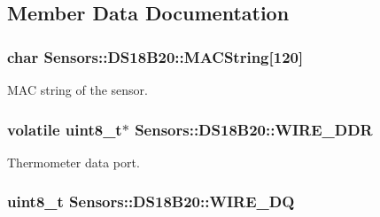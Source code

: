 \subsection{Member Data Documentation}
\subsubsection[{\texorpdfstring{M\+A\+C\+String}{MACString}}]{\setlength{\rightskip}{0pt plus 5cm}char Sensors\+::\+D\+S18\+B20\+::\+M\+A\+C\+String\mbox{[}120\mbox{]}\hspace{0.3cm}{\ttfamily [private]}}\hypertarget{classSensors_1_1DS18B20_a7c33b18028020215b85039dd9555a6df}{}\label{classSensors_1_1DS18B20_a7c33b18028020215b85039dd9555a6df}


M\+AC string of the sensor. 

\subsubsection[{\texorpdfstring{W\+I\+R\+E\+\_\+\+D\+DR}{WIRE_DDR}}]{\setlength{\rightskip}{0pt plus 5cm}volatile uint8\+\_\+t$\ast$ Sensors\+::\+D\+S18\+B20\+::\+W\+I\+R\+E\+\_\+\+D\+DR\hspace{0.3cm}{\ttfamily [private]}}\hypertarget{classSensors_1_1DS18B20_aceb52cdfb7462c8c7be8178181ae4dc5}{}\label{classSensors_1_1DS18B20_aceb52cdfb7462c8c7be8178181ae4dc5}


Thermometer data port. 

\subsubsection[{\texorpdfstring{W\+I\+R\+E\+\_\+\+DQ}{WIRE_DQ}}]{\setlength{\rightskip}{0pt plus 5cm}uint8\+\_\+t Sensors\+::\+D\+S18\+B20\+::\+W\+I\+R\+E\+\_\+\+DQ\hspace{0.3cm}{\ttfamily [private]}}\hypertarget{classSensors_1_1DS18B20_a10fe94bdfb9a37a86d34925534a4547c}{}\label{classSensors_1_1DS18B20_a10fe94bdfb9a37a86d34925534a4547c}


